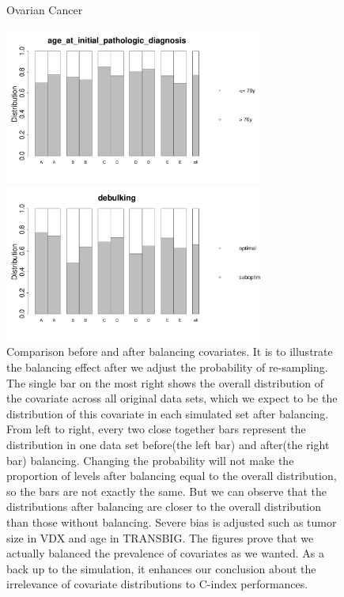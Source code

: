 \documentclass{article}
\begin{document}
\begin{figure}[H]
\centerline{Ovarian Cancer}
      \centering
        \begin{minipage}[b]{0.5\textwidth}
            \includegraphics[width=8.5cm]{barplot_ovarian_age.pdf}
        \end{minipage}%
        \begin{minipage}[b]{0.5\textwidth}
            \includegraphics[width=8.5cm]{barplot_ovarian_debulk.pdf}
        \end{minipage}
    \caption{Comparison before and after balancing covariates. It is to illustrate the balancing effect after we adjust the probability of re-sampling. The single bar on the most right shows the overall distribution of the covariate across all original data sets, which we expect to be the distribution of this covariate in each simulated set after balancing. From left to right, every two close together bars represent the distribution in one data set before(the left bar) and after(the right bar) balancing. Changing the probability will not make the proportion of levels after balancing equal to the overall distribution, so the bars are not exactly the same. But we can observe that the distributions after balancing are closer to the overall distribution than those without balancing. Severe bias is adjusted such as tumor size in VDX and age in TRANSBIG. The figures prove that we actually balanced the prevalence of covariates as we wanted. As a back up to the simulation, it enhances our conclusion about the irrelevance of covariate distributions to C-index performances.}
   \label{barplots-ovarian}
\end{figure}
\end{document}
